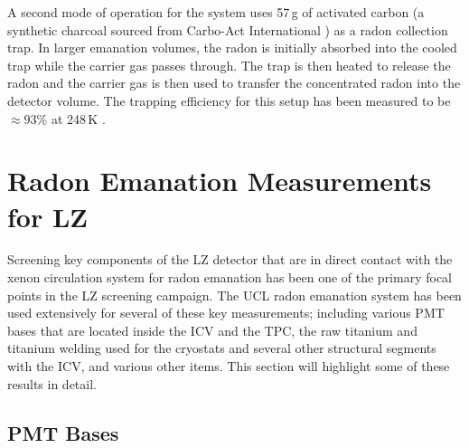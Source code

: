 A second mode of operation for the system uses 57\,g of activated carbon (a synthetic charcoal sourced from Carbo-Act International \cite{Pushkin:2018wdl}) as a radon collection trap. In larger emanation volumes, the radon is initially absorbed into the cooled trap while the carrier gas passes through. The trap is then heated to release the radon and the carrier gas is then used to transfer the concentrated radon into the detector volume. The trapping efficiency for this setup has been measured to be $\approx 93$\% at 248\,K \cite{xin_2017}.


\section{Radon Emanation Measurements for LZ}
\label{sec:uclradon}

Screening key components of the LZ detector that are in direct contact with the xenon circulation system for radon emanation has been one of the primary focal points in the LZ screening campaign. The UCL radon emanation system has been used extensively for several of these key measurements; including various PMT bases that are located inside the ICV and the TPC, the raw titanium and titanium welding used for the cryostats and several other structural segments with the ICV, and various other items. This section will highlight some of these results in detail.


\subsection{PMT Bases}
\label{secsec:pmt_base_emanation}

